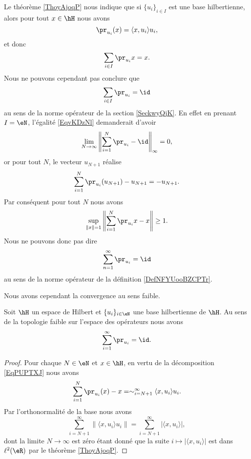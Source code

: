Le théorème \ref{ThoyAjoqP} nous indique que si \( \{ u_i \}_{i\in I}\) est une base hilbertienne, alors pour tout \( x\in \hH\) nous avons
\begin{equation}
    \pr_{u_i}(x)=\langle x, u_i\rangle u_i,
\end{equation}
et donc
\begin{equation}
    \sum_{i\in I}\pr_{u_i}x=x.
\end{equation}
Nous ne pouvons cependant pas conclure que
\begin{equation}    \label{EqvKDzNl}
    \sum_{i\in I}\pr_{u_i}=\id
\end{equation}
au sens de la norme opérateur de la section \ref{SeckwyQjK}. En effet en prenant \( I=\eN\), l'égalité \eqref{EqvKDzNl} demanderait d'avoir
\begin{equation}
    \lim_{N\to \infty} \left\| \sum_{i=1}^N\pr_{u_i}-\id \right\|_{\infty}=0,
\end{equation}
or pour tout \( N\), le vecteur \( u_{N+1}\) réalise
\begin{equation}
    \sum_{i=1}^N\pr_{u_i}(u_{N+1})-u_{N+1}=-u_{N+1}.
\end{equation}
Par conséquent pour tout \( N\) nous avons
\begin{equation}
    \sup_{\| x \|=1}\left\| \sum_{i=1}^N\pr_{u_i}x-x \right\|\geq 1.
\end{equation}
Nous ne pouvons donc pas dire
\begin{equation}
    \sum_{n=1}^{\infty}\pr_{u_i}=\id
\end{equation}
au sens de la norme opérateur de la définition \ref{DefNFYUooBZCPTr}.

Nous avons cependant la convergence au sens faible.
\begin{proposition}
    Soit \( \hH\) un espace de Hilbert et \( \{ u_i \}_{i\in \eN}\) une base hilbertienne de \( \hH\). Au sens de la topologie faible sur l'espace des opérateurs nous avons
    \begin{equation}
        \sum_{i=1}^{\infty}\pr_{u_i}=\id.
    \end{equation}
\end{proposition}

\begin{proof}
    Pour chaque \( N\in \eN\) et \( x\in\hH\), en vertu de la décomposition \eqref{EqPUPTXJ} nous avons
    \begin{equation}
        \sum_{i=1}^N\pr_{u_i}(x)-x=\sim_{i=N+1}^{\infty}\langle x, u_i\rangle u_i.
    \end{equation}
    Par l'orthonormalité de la base nous avons
    \begin{equation}
        \sum_{i=N+1}^{\infty}\| \langle x, u_i\rangle u_i \|=\sum_{i=N+1}^{\infty}| \langle x, u_i\rangle  |,
    \end{equation}
    dont la limite \( N\to \infty\) est zéro étant donné que la suite \( i\mapsto| \langle x, u_i\rangle  |\) est dans \( \ell^2(\eR)\) par le théorème \ref{ThoyAjoqP}.
\end{proof}

